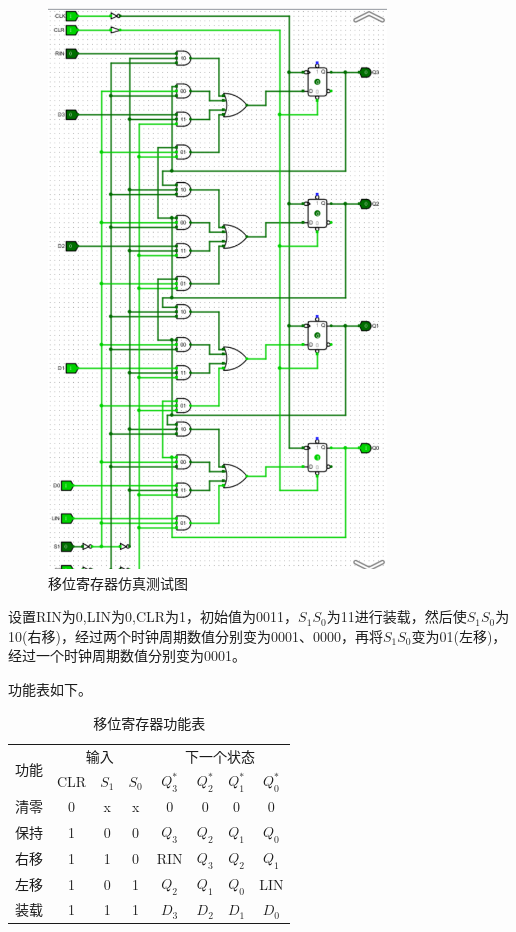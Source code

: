 \documentclass{article}
\begin{document}
    \begin{figure}[H]
    \centering
    \includegraphics[width=0.8\textwidth]{3.5.4.png}
    \caption{移位寄存器仿真测试图}
    \end{figure}

    设置RIN为0,LIN为0,CLR为1，初始值为0011，$S_{1}S_{0}$为11进行装载，然后使$S_{1}S_{0}$为10(右移)，经过两个时钟周期数值分别变为0001、0000，再将$S_{1}S_{0}$变为01(左移)，经过一个时钟周期数值分别变为0001。

    功能表如下。
    \begin{table}[H]
    \centering
    \begin{tabular}{|c|c|c|c|c|c|c|c|}
        \hline
        \multirow{2}{*}{功能}
        & \multicolumn{3}{c|}{输入} & \multicolumn{4}{c|}{下一个状态} \\ \cline{2-8}
        & CLR & $S_{1}$ & $S_{0}$ & $Q_{3}^{*}$ & $Q_{2}^{*}$ & $Q_{1}^{*}$ & $Q_{0}^{*}$ \\ 
        \hline
        \multirow{1}{*}{清零} & 0 & x & x & 0 & 0 & 0 & 0 \\ \hline
        \multirow{1}{*}{保持} & 1 & 0 & 0 & $Q_{3}$ & $Q_{2}$ & $Q_{1}$ & $Q_{0}$ \\ \hline
        \multirow{1}{*}{右移} & 1 & 1 & 0 & RIN & $Q_{3}$ & $Q_{2}$ & $Q_{1}$ \\ \hline
        \multirow{1}{*}{左移} & 1 & 0 & 1 & $Q_{2}$ & $Q_{1}$ & $Q_{0}$ & LIN \\ \hline
        \multirow{1}{*}{装载} & 1 & 1 & 1 & $D_{3}$ & $D_{2}$ & $D_{1}$ & $D_{0}$ \\ \hline
    \end{tabular}
    \caption{移位寄存器功能表}
    \end{table}
\end{document}
